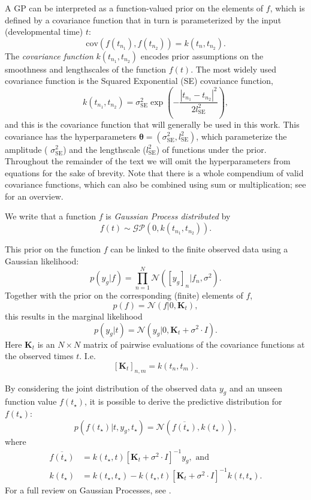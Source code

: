 A GP can be interpreted as a function-valued prior on the elements of $ f $, which is defined by a covariance function that in turn is parameterized by the input (developmental time) $ t $:
\[ \text{cov}(f(t_{n_1}), f(t_{n_2})) = k(t_n, t_{n_2}). \]
The \textit{covariance function} $ k(t_{n_1}, t_{n_2}) $ encodes prior assumptions on the smoothness and lengthscales of the function $ f(t) $. The most widely used covariance function is the Squared Exponential (SE) covariance function,
\begin{equation}
\label{eq:se-kernel}
k(t_{n_1}, t_{n_2}) = 
\sigma_{\text{SE}}^2 \exp \left( - \frac{|t_{n_1} - t_{n_2}|^2}{2l_\text{SE}^2} \right),
\end{equation}
and this is the covariance function that will generally be used in this work. This covariance has the hyperparameters $ \mathbf{\theta} = (\sigma^2_{\text{SE}}, l^2_\text{SE}) $, which parameterize the amplitude ( $\sigma_{\text{SE}}^2 $) and the lengthscale ($ l^2_{\text{SE}} $) of functions under the prior. Throughout the remainder of the text we will omit the hyperparameters from equations for the sake of brevity. Note that there is a whole compendium of valid covariance functions, which can also be combined using sum or multiplication; see \cite{Williams2006-kb} for an overview.

We write that a function $ f $ is \textit{Gaussian Process distributed} by
\[ f(t) \sim \mathcal{GP}(0, k(t_{n_1}, t_{n_2})). \]

This prior on the function $ f $ can be linked to the finite observed data using a Gaussian likelihood:
\[ p(y_g | f) = \prod_{n=1}^N \mathcal{N} ([y_g]_n | f_{n}, \sigma^2). \]
Together with the prior on the corresponding (finite) elements of $ f $,
\[ p(f) = \mathcal{N}(f | 0, \bm{K}_t), \]
this results in the marginal likelihood
\[ p(y_g | t) = \mathcal{N}(y_g | 0, \bm{K}_t + \sigma^2 \cdot I). \]
Here $ \bm{K}_t $ is an $ N \times N $ matrix of pairwise evaluations of the covariance functions at the observed times $ t $. I.e.
\begin{equation}
\label{eq:covmatrix}
[\bm{K}_t]_{n, m} = k(t_n, t_m).
\end{equation}

By considering the joint distribution of the observed data $ y_g $ and an unseen function value $ f(t_\star) $, it is possible to derive the predictive distribution for $ f(t_\star) $:
\[
p(f(t_\star) | t, y_g, t_\star) = \mathcal{N}\left( \overline{f(t_\star)}, k(t_\star) \right),
\]
where
\begin{align*}
\overline{f(t_\star)} & = k(t_\star, t) [\bm{K}_t + \sigma^2 \cdot I]^{-1} y_g, \text{ and} \\
k(t_\star) & = k(t_\star, t_\star) - k(t_\star, t)[\bm{K}_t + \sigma^2 \cdot I]^{-1} k(t, t_\star).
\end{align*}
For a full review on Gaussian Processes, see \cite{Williams2006-kb}.


